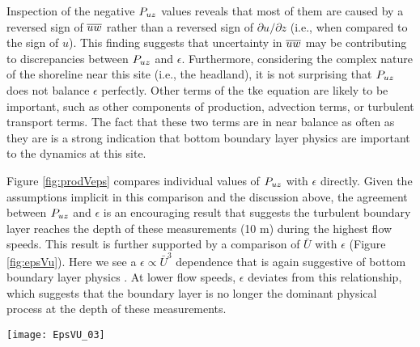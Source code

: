 Inspection of the negative $P_{uz}$ values reveals that most of them are caused by a reversed sign of $\overline{uw}$ rather than a reversed sign of $\partial u / \partial z$ (i.e., when compared to the sign of $u$). This finding suggests that uncertainty in $\overline{uw}$ may be contributing to discrepancies between $P_{uz}$ and $\epsilon$. Furthermore, considering the complex nature of the shoreline near this site (i.e., the headland), it is not surprising that $P_{uz}$ does not balance $\epsilon$ perfectly. Other terms of the $\mathrm{tke}$ equation are likely to be important, such as other components of production, advection terms, or turbulent transport terms. The fact that these two terms are in near balance as often as they are is a strong indication that bottom boundary layer physics are important to the dynamics at this site.

Figure \ref{fig:prodVeps} compares individual values of $P_{uz}$ with $\epsilon$ directly. Given the assumptions implicit in this comparison and the discussion above, the agreement between $P_{uz}$ and $\epsilon$ is an encouraging result that suggests the turbulent boundary layer reaches the depth of these measurements (10 m) during the highest flow speeds. This result is further supported by a comparison of $\bar{U}$ with $\epsilon$ (Figure \ref{fig:epsVu}). Here we see a $\epsilon \propto \bar{U}^3$ dependence that is again suggestive of bottom boundary layer physics \cite[]{Trowbridge1992,Nash++2009}. At lower flow speeds, $\epsilon$ deviates from this relationship, which suggests that the boundary layer is no longer the dominant physical process at the depth of these measurements.


\begin{figure*}[t]
  \centering
  \texttt{[image: EpsVU\_03]}
  \caption{A log-log plot of $\epsilon$ vs. $\bar{U}$ for the June 2014 TTM (diamonds) and May 2015 StableMoor (dots) deployments, during ebb (left) and flood (right). Black points are 5-minute averages.  Green dots are mean values within speed bins of 0.2 m s$^{-1}$ width that have at least 10 points (50 minutes of data); their vertical bars are 95\% bootstrap confidence intervals. The blue line shows a $U^3$ slope, wherein the proportionality constant (blue box) is calculated by taking the log-space mean of $\epsilon/U^3$. }
  \label{fig:epsVu}
\end{figure*}



